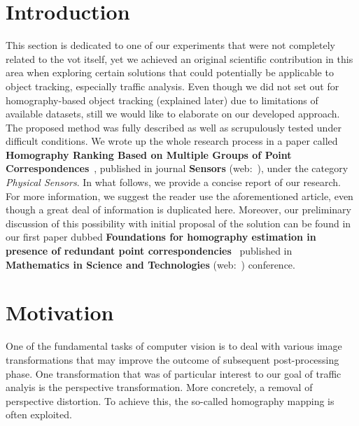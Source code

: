 \section{Introduction}
\label{sec:HomographyIntroduction}

This section is dedicated to one of our experiments that were not completely related to the \gls{vot} itself, yet we achieved an original scientific contribution in this area when exploring certain solutions that could potentially be applicable to object tracking, especially traffic analysis. Even though we did not set out for homography-based object tracking (explained later) due to limitations of available datasets, still we would like to elaborate on our developed approach. The proposed method was fully described as well as scrupulously tested under difficult conditions. We wrote up the whole research process in a paper called \textbf{Homography Ranking Based on Multiple Groups of Point Correspondences}~\cite{ondrasovic2021homography}, published in journal \textbf{Sensors} (web:~\cite{sensors}), under the category \emph{Physical Sensors}. In what follows, we provide a concise report of our research. For more information, we suggest the reader use the aforementioned article, even though a great deal of information is duplicated here. Moreover, our preliminary discussion of this possibility with initial proposal of the solution can be found in our first paper dubbed \textbf{Foundations for homography estimation in presence of redundant point correspondencies}~\cite{ondravsovivc2020foundations} published in \textbf{Mathematics in Science and Technologies} (web:~\cite{mistconf}) conference.

\section{Motivation}
\label{sec:HomographyMotivation}

One of the fundamental tasks of computer vision is to deal with various image transformations that may improve the outcome of subsequent post-processing phase. One transformation that was of particular interest to our goal of traffic analyis is the perspective transformation. More concretely, a removal of perspective distortion. To achieve this, the so-called homography mapping is often exploited.

